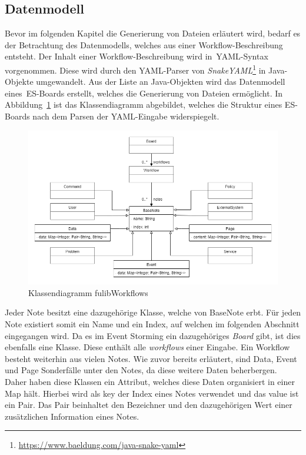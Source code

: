 \subsection{Datenmodell}\label{subsec:datenmodell}
Bevor im folgenden Kapitel die Generierung von Dateien erläutert wird, bedarf es der Betrachtung
des Datenmodells, welches aus einer Workflow-Beschreibung entsteht.
Der Inhalt einer Workflow-Beschreibung wird in~\ac{YAML}-Syntax vorgenommen.
Diese wird durch den YAML-Parser von \textit{SnakeYAML}\footnote{\url{https://www.baeldung.com/java-snake-yaml}} in Java-Objekte umgewandelt.
Aus der Liste an Java-Objekten wird das Datenmodell eines~\ac{ES}-Boards erstellt, welches die Generierung von Dateien ermöglicht.
In Abbildung~\ref{fig:classdiagram} ist das Klassendiagramm abgebildet, welches die Struktur eines \ac{ES}-Boards nach dem Parsen der YAML-Eingabe widerspiegelt.

\begin{figure}[h]
    \centering
    \includegraphics[width=1\textwidth]{images/3.1/classdiagram.drawio}
    \caption{Klassendiagramm fulibWorkflows}
    \label{fig:classdiagram}
\end{figure}

Jeder Note besitzt eine dazugehörige Klasse, welche von BaseNote erbt.
Für jeden Note existiert somit ein Name und ein Index, auf welchen im folgenden Abschnitt eingegangen wird.
Da es im Event Storming ein dazugehöriges \textit{Board} gibt, ist dies ebenfalls eine Klasse.
Diese enthält alle \textit{workflows} einer Eingabe.
Ein Workflow besteht weiterhin aus vielen Notes.
Wie zuvor bereits erläutert, sind Data, Event und Page Sonderfälle unter den Notes, da diese weitere Daten beherbergen.
Daher haben diese Klassen ein Attribut, welches diese Daten organisiert in einer Map hält.
Hierbei wird als key der Index eines Notes verwendet und das value ist ein Pair.
Das Pair beinhaltet den Bezeichner und den dazugehörigen Wert einer zusätzlichen Information eines Notes.
